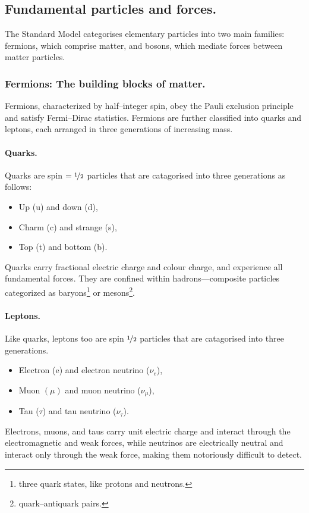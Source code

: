 \begin{definition}
\subsection{Fundamental particles and forces.}
The Standard Model categorises elementary particles into two main families: fermions, which comprise matter, and bosons, which mediate forces between matter particles.
\subsubsection{Fermions: The building blocks of matter.}
Fermions, characterized by half--integer spin, obey the Pauli exclusion principle and satisfy Fermi--Dirac statistics.
%
Fermions are further classified into quarks and leptons, each arranged in three generations of increasing mass.
\paragraph{Quarks.}
Quarks are spin $ = \nicefrac{1}{2}$ particles that are catagorised into three generations as follows:
\begin{itemize}
    \item Up (u) and down (d),
    \item Charm (c) and strange (s),
    \item Top (t) and bottom (b).
\end{itemize}

Quarks carry fractional electric charge and colour charge, and experience all fundamental forces.
%
They are confined within hadrons---composite particles categorized as baryons\footnote{three quark states, like protons and neutrons.} or mesons\footnote{quark--antiquark pairs.}.

\paragraph{Leptons.}
Like quarks, leptons too are spin \(\nicefrac12\) particles that are catagorised into three generations.
\begin{itemize}
    \item Electron (e) and electron neutrino ($\nu_e$),
    \item Muon $(\mu)$ and muon neutrino ($\nu_\mu$),
    \item Tau ($\tau$) and tau neutrino ($\nu_\tau$).
\end{itemize}

Electrons, muons, and taus carry unit electric charge and interact through the electromagnetic and weak forces, while neutrinos are electrically neutral and interact only through the weak force, making them notoriously difficult to detect.


\end{definition}
